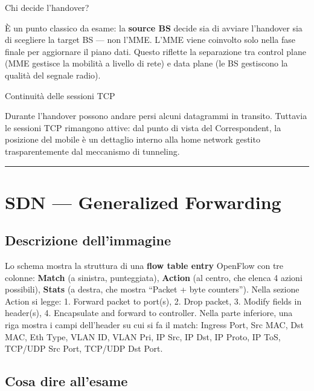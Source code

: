\documentclass[
  italian,
  openany]{book}
\begin{document}
\begin{callouttip}{Chi decide l’handover?}

È un punto classico da esame: la \textbf{source BS} decide sia di
avviare l'handover sia di scegliere la target BS --- non l'MME. L'MME
viene coinvolto solo nella fase finale per aggiornare il piano dati.
Questo riflette la separazione tra control plane (MME gestisce la
mobilità a livello di rete) e data plane (le BS gestiscono la qualità
del segnale radio).

\end{callouttip}

\begin{calloutnote}{Continuità delle sessioni TCP}

Durante l'handover possono andare persi alcuni datagrammi in transito.
Tuttavia le sessioni TCP rimangono attive: dal punto di vista del
Correspondent, la posizione del mobile è un dettaglio interno alla home
network gestito trasparentemente dal meccanismo di tunneling.

\end{calloutnote}

\begin{center}\rule{0.5\linewidth}{0.5pt}\end{center}

\section{SDN --- Generalized
Forwarding}\label{sdn-generalized-forwarding}

\subsection{Descrizione dell'immagine}\label{descrizione-dellimmagine-6}

Lo schema mostra la struttura di una \textbf{flow table entry} OpenFlow
con tre colonne: \textbf{Match} (a sinistra, punteggiata),
\textbf{Action} (al centro, che elenca 4 azioni possibili),
\textbf{Stats} (a destra, che mostra ``Packet + byte counters''). Nella
sezione Action si legge: 1. Forward packet to port(s), 2. Drop packet,
3. Modify fields in header(s), 4. Encapsulate and forward to controller.
Nella parte inferiore, una riga mostra i campi dell'header su cui si fa
il match: Ingress Port, Src MAC, Dst MAC, Eth Type, VLAN ID, VLAN Pri,
IP Src, IP Dst, IP Proto, IP ToS, TCP/UDP Src Port, TCP/UDP Dst Port.

\subsection{Cosa dire all'esame}\label{cosa-dire-allesame-6}
\end{document}
